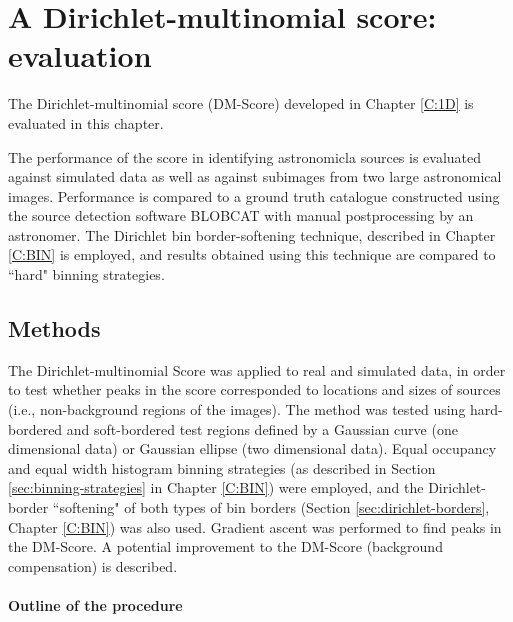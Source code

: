 \chapter[Dirichlet-multinomial score: evaluation]{A Dirichlet-multinomial score: evaluation}\label{C:2D}

The Dirichlet-multinomial score (DM-Score) developed in Chapter \ref{C:1D} is evaluated in this chapter. 

The performance of the score in identifying astronomicla sources is evaluated against simulated data as well as against subimages from two large astronomical images. Performance is compared to a ground truth catalogue constructed using the source detection software BLOBCAT \cite{hales2012blobcat} with manual postprocessing by an astronomer. The Dirichlet bin border-softening technique, described in Chapter \ref{C:BIN} is employed, and results obtained using this technique are compared to ``hard" binning strategies.


\section{Methods}

The Dirichlet-multinomial Score was applied to real and simulated data, in order to test whether peaks in the score corresponded to locations and sizes of sources (i.e., non-background regions of the images). The method was tested using hard-bordered and soft-bordered test regions defined by a Gaussian curve (one dimensional data) or Gaussian ellipse (two dimensional data). Equal occupancy and equal width histogram binning strategies (as described in Section \ref{sec:binning-strategies} in Chapter \ref{C:BIN}) were employed, and the Dirichlet-border ``softening" of both types of bin borders (Section \ref{sec:dirichlet-borders}, Chapter \ref{C:BIN}) was also used. Gradient ascent was performed to find peaks in the DM-Score. A potential improvement to the DM-Score (background compensation) is described.

\subsubsection{Outline of the procedure}

